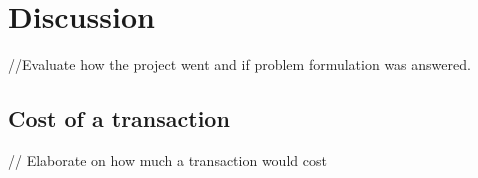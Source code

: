 \section{Discussion}\label{sec:discussion}

//Evaluate how the project went and if problem formulation was answered.

\subsection{Cost of a transaction}

// Elaborate on how much a transaction would cost